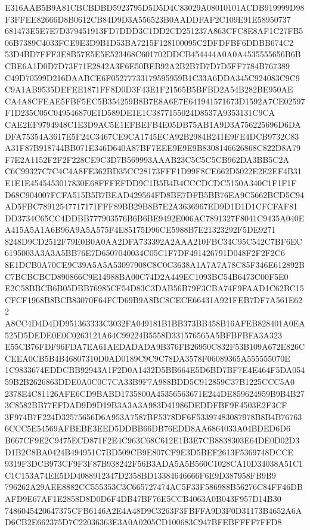 \documentclass[UTF8,fontset=fandol,zihao=-4,a4paper]{ctexart}
\begin{document}
{{E316AAB5B9A81CBCBDBD5923795D5D5D4C83029A08010101ACDB919999D98F3FFEE82666D8B0612CB84D9D3A556523B0AADDFAF2C109E91E58950737
681473E5E7E7D379451913FD7DDD3C1DD2CD251237A863CFC8E8AF1C27FB506B7389C4033FCE9E3D9B1D53BA7215F128100095C2DFDFBF6DDBB674C2
53D4BD7FFF3E8B57E5E5E523468C601702DDCB454444A0A0A4535555656B6BCBE6A1D0D7D73F71E2842A3F6E50BEB92A2B2B7D7D7D5FF7784B767389
C49D70599D216DAABCE6F05277733179595959B1C33A6DDA345C924083C9C9C9A1AB9535DEFEE1871FF8D0D3F43E1F21565B5BFBD2A54B282BE950AE
CA4A8CFEAE5FBF5EC5B354259B8B7E8A6E7E641941571673D1592A7CE02597F1D235C05C049546870E1D589DE1E1C3877155024D8537A9353131C9CA
CAE2EF9794948C1E3D9AC5E1EFBEFB4E05DB75AB1A9D3A756225696D6DADFA75354A3617E5F24C3467CE9CA1745ECA92B2984B241E9FE4DCB9732C83
A31F87B918744BB071E346D640A87BF7EEE9E9E9B8308146626868C822D8A79F7E2A1152F2F2F228CE9C3D7B569993AAAB23C5C5C5CB962DA3BB5C2A
C6C99327C7C4C4A8FE362BD35CC28173FFF1D99F8CE662D5022E2E2EF4B31E1E1E4545453017830E68FFFEFDD9C1B5B4B4CCCDCDC5150A340C1F1F1F
D68C904007FCFA515B5B7BEAD429564FD8BE7DFB5BB76EA9C5662BCD5C94AD5FBC78912547717171FFF89BB29B8B7E2A3636967ED9D1D1D1CFCFAF81
DD3734C65CC4DDBB777903576B6B6BE9492E006AC7891327F8041C9435A040EA415A5A1A6B96A9A5A575F4E85175D96CE5988B7E21323292F5DE9271
8248D9CD2512F79E0B0A0AA2DFA733392A2AAA210FBC34C95C542C7BF6EC6195003A3A3A5BB76E7D6507040034C05C1F7DF491426791D048F2F2F2C6
8E1DCB0A70CE9C39A5A5A53097908C8C0C3638A1A7A7A78C85F346E612892BC7BCBCBCD890866C9E14988BA00C74D2A449EC1093BC54B6473C00F5E0
E2C58BBCB6B05DBB76985CF54D83C3DAB56B79F3CBA74F9FAAD1C62BC15CFCF1968B8BCB83070F64FCD69B9A8BC8CECE66431A921FEB7DF7A561E622
A8CC4D4D4DD951363333C3032FA049181B1BB373BB458B16AFEB828401A0EA525D5DEDE0E0C0263121A64C99224B5558D331576565A5BFBFBFA3A323
E55CB76FDF96FDA7EA61AEDADADA9B376FB26950C832F53B109A672E826CCEEA0CB5B4B46807310D0AD0189C9C9C78DA3578F06089365A555555070E
1C9833674EDDCBB92943A1F2D0A1432D5BB664E5D6BD7BF7E4E464F5DA05459B2B2626863DDE0A0C0C7CA33B9F7A988BDD5C912859C37B1225CCC5A0
2378E4C81126AFE6CD9BABD1735800A45356563671E244DE859624959B9B4B273C8582BB77EFDAD9D9D19B3A3A3A983D41986DEDDFBF9F4503E2F3CF
3F974B7F224D32575656D6A953A7587BF5378DF6F53397483087978B8B4B767636CCC5E54569AFBEBE3EED5DDBB66DB76EDD8AA6864033A04BDED6D6
B667CF9E2C9475ECD871F2E4C963C68C612E1B3E7CB8838303E64DE0D02D3D1B2C8BA0424B494951C7BD509CB9E807CF9E3D5BEF2613F5369748DCCE
9319F3DCB973CF9F3F87B938242F56B3ADA5A5B560C1028CA10D34038A51C1C1C153A74EE5DD4088912347D2358BD13384646666F6E9D387958FB9B9
796262A29AEE8882CC555353C3C665727474AC5F33F586988B56276C84FF46DBAFD9E67AF1E2858D8D0D6F4DB47BF76E5CCB4063A0B043F957D14B30
7486045420647375CFB6146A2E4A48D9C3263F3FBFFA9D3F0D31173B4652A6AD6CB2E662375D7C22036363E3A0A0205CD100683C947BFEBFFFF7FFD8
}}
\end{document}
